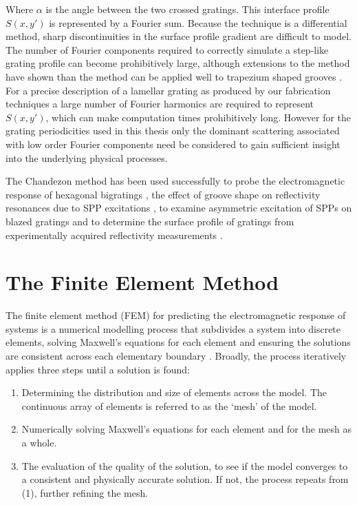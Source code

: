Where $\alpha$ is the angle between the two crossed gratings.
This interface profile $S(x,y')$ is represented by a Fourier sum. Because the technique is a differential method, sharp discontinuities in the surface profile gradient are difficult to model. The number of Fourier components required to correctly simulate a step-like grating profile can become prohibitively large, although extensions to the method have shown than the method can be applied well to trapezium shaped grooves \cite{Chandezon2001}. For a precise description of a lamellar grating as produced by our fabrication techniques a large number of Fourier harmonics are required to represent $S(x,y')$, which can make computation times prohibitively long. However for the grating periodicities used in this thesis only the dominant scattering associated with low order Fourier components need be considered to gain sufficient insight into the underlying physical processes.

The Chandezon method has been used successfully to probe the electromagnetic response of hexagonal bigratings \cite{Watts1996}, the effect of groove shape on reflectivity resonances due to SPP excitations \cite{Watts1998,Watts1999}, to examine asymmetric excitation of SPPs on blazed gratings \cite{Bai2009} and to determine the surface profile of gratings from experimentally acquired reflectivity measurements \cite{T.Hallam2000}. 


\section{The Finite Element Method}

The finite element method (FEM)  for predicting the electromagnetic response of systems is a numerical modelling process that subdivides a system into discrete elements, solving Maxwell's equations for each element and ensuring the solutions are consistent across each elementary boundary \cite{Press,Bao}. 
Broadly, the process iteratively applies three steps until a solution is found: 
\begin{enumerate}
\item{Determining the distribution and size of elements across the model. The continuous array of elements is referred to as the `mesh' of the model.}
\item{
Numerically solving Maxwell's equations for each element and for the mesh as a whole.}
\item{The evaluation of the quality of the solution, to see if the model converges to a consistent and physically accurate solution. If not, the process repeats from (1), further refining the mesh.}
\end{enumerate}

